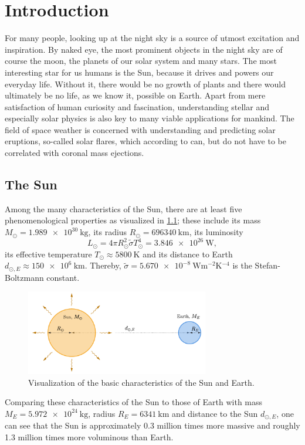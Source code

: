 \documentclass[a4paper,12pt]{report}
\begin{document}

\thispagestyle{empty}
\newpage
\thispagestyle{empty}

\newpage
{}
\tableofcontents
\FloatBarrier
\newpage
{}
\setcounter{page}{1}

\chapter{Introduction}
For many people, looking up at the night sky is a source of utmost excitation and inspiration. By naked eye, the most prominent objects in the night sky are of course the moon, the planets of our solar system and many stars. The most interesting star for us humans is the Sun, because it drives and powers our everyday life. Without it, there would be no growth of plants and there would ultimately be no life, as we know it, possible on Earth. Apart from mere satisfaction of human curiosity and fascination, understanding stellar and especially solar physics is also key to many viable applications for mankind. The field of space weather is concerned with understanding and predicting solar eruptions, so-called solar flares, which according to \cite[p.436]{Stix.2002} can, but do not have to be correlated with coronal mass ejections.

\section{The Sun}
Among the many characteristics of the Sun, there are at least five phenomenological properties as visualized in \cref{fig:SunEarth}; these include its mass $M_\odot = \SI{1.989e30}{\kilogram}$, its radius $R_\odot = \SI{696340}{\kilo\meter}$, its luminosity \begin{equation}L_\odot = 4\pi R_\odot^2 \tilde{\sigma} T_\odot^4 = \SI{3.846e26}{\watt},
\end{equation} its effective temperature $T_{\odot} \approx \SI{5800}{\kelvin}$ and its distance to Earth $d_{\odot,E} \approx \SI{150e6}{\kilo\meter}$. Thereby, $\tilde{\sigma} = \SI{5.670e-8}{\watt\meter^{-2}\kelvin^{-4}}$ is the Stefan-Boltzmann constant.
\begin{figure}[h]
\centering
\includegraphics[width=8cm]{figures/SunEarth.pdf}
\caption{Visualization of the basic characteristics of the Sun and Earth.}
\label{fig:SunEarth}
\end{figure}
Comparing these characteristics of the Sun to those of Earth with mass $M_E = \SI{5.972e24}{\kilogram}$, radius $R_E = \SI{6341}{\kilo\meter}$ and distance to the Sun $d_{\odot,E}$, one can see that the Sun is approximately 0.3 million times more massive and roughly 1.3 million times more voluminous than Earth.
\end{document}
